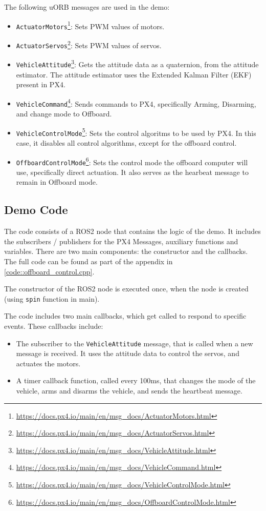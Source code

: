 \documentclass[a4paper]{article}
\begin{document}
The following uORB messages are used in the demo: 

\begin{itemize}
    \item \verb|ActuatorMotors|\footnote{\url{https://docs.px4.io/main/en/msg_docs/ActuatorMotors.html}}: Sets PWM values of motors. 
    \item \verb|ActuatorServos|\footnote{\url{https://docs.px4.io/main/en/msg_docs/ActuatorServos.html}}: Sets PWM values of servos. 
    \item \verb|VehicleAttitude|\footnote{\url{https://docs.px4.io/main/en/msg_docs/VehicleAttitude.html}}: Gets the attitude data as a quaternion, from the attitude estimator. The attitude estimator uses the Extended Kalman Filter (EKF) present in PX4. 
    \item \verb|VehicleCommand|\footnote{\url{https://docs.px4.io/main/en/msg_docs/VehicleCommand.html}}: Sends commands to PX4, specifically Arming, Disarming, and change mode to Offboard. 
    \item \verb|VehicleControlMode|\footnote{\url{https://docs.px4.io/main/en/msg_docs/VehicleControlMode.html}}: Sets the control algoritms to be used by PX4. In this case, it disables all control algorithms, except for the offboard control. 
    \item \verb|OffboardControlMode|\footnote{\url{https://docs.px4.io/main/en/msg_docs/OffboardControlMode.html}}: Sets the control mode the offboard computer will use, specifically direct actuation. It also serves as the hearbeat message to remain in Offboard mode. 
\end{itemize}

\subsection{Demo Code}

The code consists of a ROS2 node that contains the logic of the demo. 
It includes the subscribers / publishers for the PX4 Messages, auxiliary functions and variables. 
There are two main components: the constructor and the callbacks. 
The full code can be found as part of the appendix in \ref{code::offboard_control.cpp}. 

The constructor of the ROS2 node is executed once, when the node is created (using \verb|spin| function in main). 

The code includes two main callbacks, which get called to respond to specific events. These callbacks include: 
\begin{itemize}
    \item The subscriber to the \verb|VehicleAttitude| message, that is called when a new message is received. It uses the attitude data to control the servos, and actuates the motors. 
    \item A timer callback function, called every 100ms, that changes the mode of the vehicle, arms and disarms the vehicle, and sends the heartbeat message. 
\end{itemize}
\end{document}
